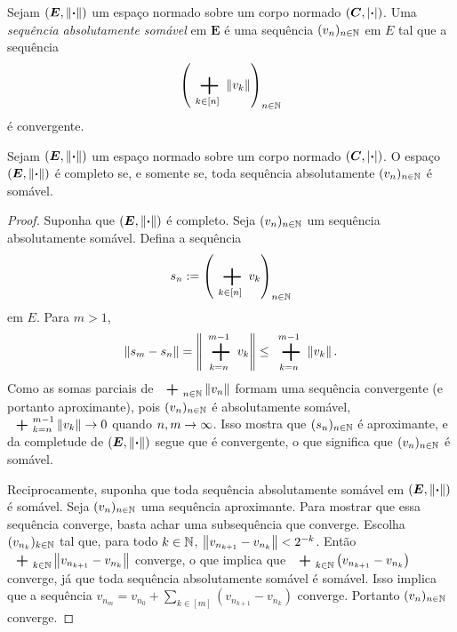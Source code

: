 \begin{definition}
Sejam $(\bm E,\left\Vert{\bm{\cdot}}\right\Vert)$ um espaço normado sobre um corpo normado $(\bm C,\left\vert{\bm{\cdot}}\right\vert)$. Uma \emph{sequência absolutamente somável} em $\bm E$ é uma sequência $(v_n)_{n \in \mathbb{N}}$ em $E$ tal que a sequência
	\begin{equation*}
	\left( \sum_{k \in [n]} \nor{v_k} \right)_{n \in \N}
	\end{equation*}
é convergente.
\end{definition}

\begin{proposition}
\label{ana:prop.abs.som.e.som}
Sejam $(\bm E,\left\Vert{\bm{\cdot}}\right\Vert)$ um espaço normado sobre um corpo normado $(\bm C,\left\vert{\bm{\cdot}}\right\vert)$. O espaço $(\bm E,\left\Vert{\bm{\cdot}}\right\Vert)$ é completo se, e somente se, toda sequência absolutamente $(v_n)_{n \in \mathbb{N}}$ é somável.
\end{proposition}
\begin{proof}
Suponha que $(\bm E,\left\Vert{\bm{\cdot}}\right\Vert)$ é completo. Seja $(v_n)_{n \in \mathbb{N}}$ um sequência absolutamente somável. Defina a sequência
	\begin{equation*}
	s_n := \left( \sum_{k \in [n]} v_k \right)_{n \in \N}
	\end{equation*}
em $E$. Para $m>1$,
	\begin{equation*}
	\nor{s_m - s_n} = \nor{\sum_{k=n}^{m-1} v_k} \leq \sum_{k=n}^{m-1} \nor{v_k}.
	\end{equation*}
Como as somas parciais de $\sum_{n \in \N} \nor{v_n}$ formam uma sequência convergente (e portanto aproximante), pois $(v_n)_{n \in \mathbb{N}}$ é absolutamente somável, $\sum_{k=n}^{m-1} \nor{v_k} \conv 0$ quando $n,m \rightarrow \infty$. Isso mostra que $(s_n)_{n \in \mathbb{N}}$ é aproximante, e da completude de $(\bm E,\left\Vert{\bm{\cdot}}\right\Vert)$ segue que é convergente, o que significa que $(v_n)_{n \in \mathbb{N}}$ é somável.

Reciprocamente, suponha que toda sequência absolutamente somável em $(\bm E,\left\Vert{\bm{\cdot}}\right\Vert)$ é somável. Seja $(v_n)_{n \in \mathbb{N}}$ uma sequência aproximante. Para mostrar que essa sequência converge, basta achar uma subsequência que converge. Escolha $(v_{n_k})_{k \in \mathbb{N}}$ tal que, para todo $k \in \mathbb{N}$, $\left\Vert{v_{n_{k+1}} - v_{n_k}}\right\Vert < 2^{-k}$. Então $\sum_{k \in \N} \nor{v_{n_{k+1}} - v_{n_k}}$ converge, o que implica que $\sum_{k \in \N} \left( v_{n_{k+1}} - v_{n_k} \right)$ converge, já que toda sequência absolutamente somável é somável. Isso implica que a sequência $v_{n_m} = v_{n_0} + \sum_{k \in [m]} \left( v_{n_{k+1}} - v_{n_k} \right)$ converge. Portanto $(v_n)_{n \in \mathbb{N}}$ converge.
\end{proof}


